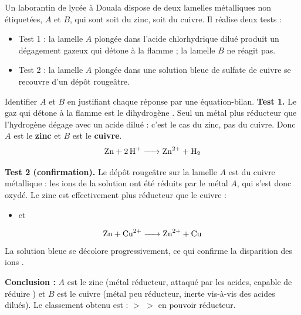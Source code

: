 \documentclass[11pt]{article}
\begin{document}
\begin{exoresolu}
Un laborantin de lycée à Douala dispose de deux lamelles métalliques non étiquetées, $A$ et $B$, qui sont soit du zinc, soit du cuivre. Il réalise deux tests :
\begin{itemize}
\item Test 1 : la lamelle $A$ plongée dans l'acide chlorhydrique dilué produit un dégagement gazeux qui détone à la flamme ; la lamelle $B$ ne réagit pas.
\item Test 2 : la lamelle $A$ plongée dans une solution bleue de sulfate de cuivre se recouvre d'un dépôt rougeâtre.
\end{itemize}
Identifier $A$ et $B$ en justifiant chaque réponse par une équation-bilan.
\tcblower
\textbf{Test 1.} Le gaz qui détone à la flamme est le dihydrogène . Seul un métal plus réducteur que l'hydrogène dégage  avec un acide dilué : c'est le cas du zinc, pas du cuivre. Donc $A$ est le \textbf{zinc} et $B$ est le \textbf{cuivre}.
\[ \ce{Zn + 2H+ -> Zn^2+ + H2} \]

\textbf{Test 2 (confirmation).} Le dépôt rougeâtre sur la lamelle $A$ est du cuivre métallique : les ions  de la solution ont été réduits par le métal $A$, qui s'est donc oxydé. Le zinc est effectivement plus réducteur que le cuivre :
\begin{itemize}
\item {} et 
\end{itemize}
\[ \ce{Zn + Cu^2+ -> Zn^2+ + Cu} \]
La solution bleue se décolore progressivement, ce qui confirme la disparition des ions .

\textbf{Conclusion :} $A$ est le zinc (métal réducteur, attaqué par les acides, capable de réduire ) et $B$ est le cuivre (métal peu réducteur, inerte vis-à-vis des acides dilués). Le classement obtenu est :  $>$  $>$  en pouvoir réducteur.
\end{exoresolu}
\end{document}
